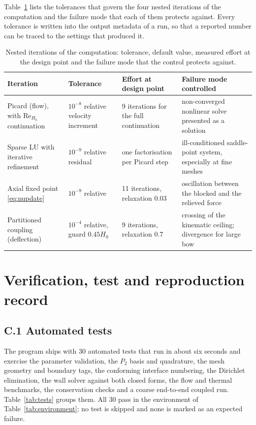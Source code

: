 \documentclass[11pt,a4paper]{article}
\newcommand{\ReH}{\mathrm{Re}_{H_0}}
\begin{document}
Table~\ref{tab:tolerances} lists the tolerances that govern the four nested
iterations of the computation and the failure mode that each of them
protects against. Every tolerance is written into the output metadata of a
run, so that a reported number can be traced to the settings that produced
it.

\begin{table}[htbp]
\centering
\caption{Nested iterations of the computation: tolerance, default value,
measured effort at the design point and the failure mode that the control
protects against.}
\label{tab:tolerances}
\small
\begin{tabular}{@{}p{2.9cm}p{2.2cm}p{2.4cm}p{5.0cm}@{}}
\toprule
Iteration & Tolerance & Effort at design point & Failure mode controlled\\
\midrule
Picard (flow), with $\ReH$ continuation &
$10^{-8}$ relative velocity increment &
9 iterations for the full continuation &
non-converged nonlinear solve presented as a solution\\
Sparse LU with iterative refinement &
$10^{-9}$ relative residual &
one factorisation per Picard step &
ill-conditioned saddle-point system, especially at fine meshes\\
Axial fixed point \eqref{eq:nupdate} &
$10^{-9}$ relative &
11 iterations, relaxation $0.03$ &
oscillation between the blocked and the relieved force\\
Partitioned coupling (deflection) &
$10^{-4}$ relative, guard $0.45H_0$ &
9 iterations, relaxation $0.7$ &
crossing of the kinematic ceiling; divergence for large bow\\
\bottomrule
\end{tabular}
\end{table}

\section{Verification, test and reproduction record}
\label{app:repro}

\subsection*{C.1 Automated tests}

The program ships with 30 automated tests that run in about six seconds and
exercise the parameter validation, the $P_2$ basis and quadrature, the mesh
geometry and boundary tags, the conforming interface numbering, the Dirichlet
elimination, the wall solver against both closed forms, the flow and thermal
benchmarks, the conservation checks and a coarse end-to-end coupled run.
Table~\ref{tab:tests} groups them. All 30 pass in the environment of
Table~\ref{tab:environment}; no test is skipped and none is marked as an
expected failure.
\end{document}
